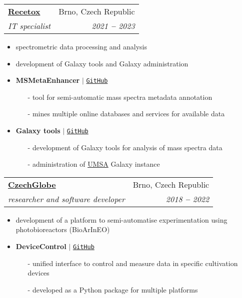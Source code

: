 \documentclass[letterpaper,11pt]{article}
\makeatletter
\newcommand{\resumeSubheading}[4]{
  \vspace{-2pt}\item
    \begin{tabular*}{0.97\textwidth}[t]{l@{\extracolsep{\fill}}r}
      \textbf{#1} & #2 \\
      \textit{\small#3} & \textit{\small #4} \\
    \end{tabular*}\vspace{-7pt}
}
\makeatother
\begin{document}
  \resumeSubheading
  {\href{https://www.recetox.muni.cz/en/services/data-services-1/spectrometric-data-processing-and-analysis}{Recetox}}{Brno, Czech Republic}
  {IT specialist}{2021 \textbf{--} 2023}
  \small{
    \begin{itemize}
      \item spectrometric data processing and analysis
      \item development of Galaxy tools and Galaxy administration
      \item \textbf{MSMetaEnhancer} $|$ \href{https://github.com/RECETOX/MSMetaEnhancer}{\color{blue}\texttt{GitHub}} \vspace{-2pt}
      \begin{itemize}
        \item[-] tool for semi-automatic mass spectra metadata annotation \vspace{-2pt}
        \item[-] mines multiple online databases and services for available data \vspace{-2pt}
      \end{itemize}
      \item \textbf{Galaxy tools} $|$ \href{https://github.com/RECETOX/galaxytools}{\color{blue}\texttt{GitHub}} \vspace{-2pt}
      \begin{itemize}
        \item[-] development of Galaxy tools for analysis of mass spectra data \vspace{-2pt}
        \item[-] administration of \href{https://umsa.cerit-sc.cz/}{UMSA} Galaxy instance \vspace{-2pt}
      \end{itemize}
    \end{itemize}
  }

  \vspace{10pt}

  \resumeSubheading
  {\href{http://czechglobe.cz/en/}{CzechGlobe}}{Brno, Czech Republic}
  {researcher and software developer}{2018 \textbf{--} 2022}
  \small{
    \begin{itemize}
      \item development of a platform to semi-automatise experimentation using photobioreactors (BioArInEO)
      \item \textbf{DeviceControl} $|$ \href{https://github.com/SmartBioTech/DeviceControl}{\color{blue}\texttt{GitHub}} \vspace{-2pt}
      \begin{itemize}
        \item[-] unified interface to control and measure data in specific cultivation devices \vspace{-2pt}
        \item[-] developed as a Python package for multiple platforms \vspace{-2pt}
      \end{itemize}
    \end{itemize}
  }
\end{document}
